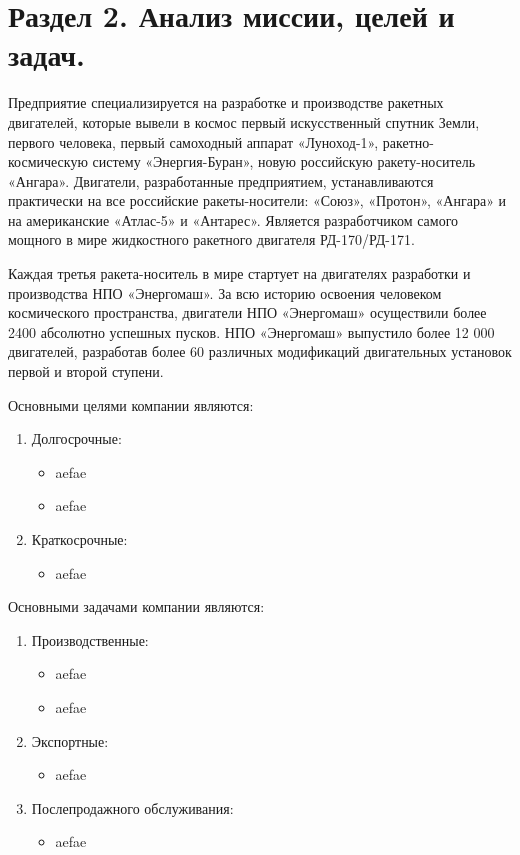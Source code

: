 \section{Раздел 2. Анализ миссии, целей и задач.}

Предприятие специализируется на разработке и производстве ракетных двигателей, которые вывели в космос первый искусственный спутник Земли, первого человека, первый самоходный аппарат «Луноход-1», ракетно-космическую систему «Энергия-Буран», новую российскую ракету-носитель «Ангара». Двигатели, разработанные предприятием, устанавливаются практически на все российские ракеты-носители: «Союз», «Протон», «Ангара» и на американские «Атлас-5» и «Антарес». Является разработчиком самого мощного в мире жидкостного ракетного двигателя РД-170/РД-171.

Каждая третья ракета-носитель в мире стартует на двигателях разработки и производства НПО «Энергомаш». За всю историю освоения человеком космического пространства, двигатели НПО «Энергомаш» осуществили более 2400 абсолютно успешных пусков. НПО «Энергомаш» выпустило более 12 000 двигателей, разработав более 60 различных модификаций двигательных установок первой и второй ступени.

Основными целями компании являются:
\begin{enumerate}
    \item Долгосрочные:
    \begin{itemize}
        \item aefae
        \item aefae
    \end{itemize}
    \item Краткосрочные:
    \begin{itemize}
        \item aefae
    \end{itemize}
\end{enumerate}

Основными задачами компании являются:
\begin{enumerate}
    \item Производственные:
    \begin{itemize}
        \item aefae
        \item aefae
    \end{itemize}
    \item Экспортные:
    \begin{itemize}
        \item aefae
    \end{itemize}
    \item Послепродажного обслуживания:
    \begin{itemize}
        \item aefae
    \end{itemize}
\end{enumerate}

\pagebreak